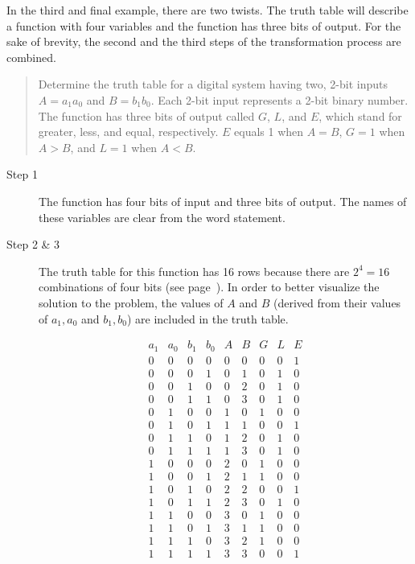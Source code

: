 \begin{description}
\end{description}

In the third and final example, there are two twists.  The truth
table will describe a function with four variables and the function
has three bits of output.  For the sake of brevity, the second and the 
third steps of the transformation process are combined.

\begin{quote}
Determine the truth table for a digital system having two, 2-bit 
inputs $A=a_1 a_0$ and $B=b_1 b_0$. Each 2-bit input represents a 
2-bit binary number.  The function has three bits of output called
$G$, $L$, and $E$, which stand for greater, less, and equal, respectively.
$E$ equals 1 when $A=B$, $G=1$ when $A>B$, and $L=1$ when $A<B$.
\end{quote}

\begin{description}
\item [Step 1] The function has four bits of input and three bits of output.
The names of these variables are clear from the word statement.

\item[Step 2 \& 3]  The truth table for this function has 16 rows
because there are $2^4=16$ combinations of four bits 
(see page~\pageref{page:two-to-N}).
In order to better visualize the solution to the problem, the values of $A$ and
$B$ (derived from their values of $a_1,a_0$ and $b_1,b_0$) are included 
in the truth table.  

$$\begin{array}{c|c|c|c||c|c||c|c|c}
a_1 & a_0 & b_1 & b_0 & A & B & G & L & E \\ \hline
0 & 0 & 0 & 0 & 0 & 0 & 0 & 0 & 1  \\ \hline
0 & 0 & 0 & 1 & 0 & 1 & 0 & 1 & 0  \\ \hline
0 & 0 & 1 & 0 & 0 & 2 & 0 & 1 & 0  \\ \hline
0 & 0 & 1 & 1 & 0 & 3 & 0 & 1 & 0  \\ \hline
0 & 1 & 0 & 0 & 1 & 0 & 1 & 0 & 0  \\ \hline
0 & 1 & 0 & 1 & 1 & 1 & 0 & 0 & 1  \\ \hline
0 & 1 & 1 & 0 & 1 & 2 & 0 & 1 & 0  \\ \hline
0 & 1 & 1 & 1 & 1 & 3 & 0 & 1 & 0  \\ \hline
1 & 0 & 0 & 0 & 2 & 0 & 1 & 0 & 0  \\ \hline
1 & 0 & 0 & 1 & 2 & 1 & 1 & 0 & 0  \\ \hline
1 & 0 & 1 & 0 & 2 & 2 & 0 & 0 & 1  \\ \hline
1 & 0 & 1 & 1 & 2 & 3 & 0 & 1 & 0  \\ \hline
1 & 1 & 0 & 0 & 3 & 0 & 1 & 0 & 0  \\ \hline
1 & 1 & 0 & 1 & 3 & 1 & 1 & 0 & 0  \\ \hline
1 & 1 & 1 & 0 & 3 & 2 & 1 & 0 & 0  \\ \hline
1 & 1 & 1 & 1 & 3 & 3 & 0 & 0 & 1  \\ 
\end{array}$$
\end{description}

